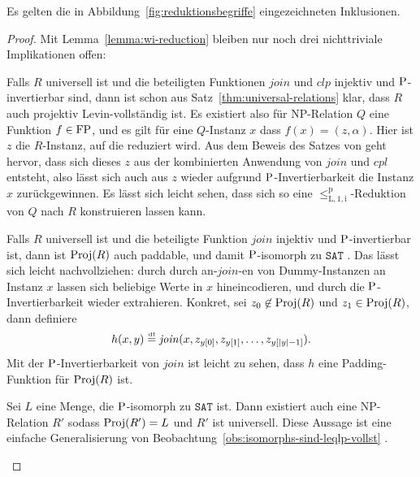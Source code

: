 \begin{lemma}
    Es gelten die in Abbildung~\ref{fig:reduktionsbegriffe} eingezeichneten Inklusionen.
\end{lemma}
\begin{proof}
    Mit Lemma~\ref{lemma:wi-reduction} bleiben nur noch drei nichttriviale Implikationen offen:
    \begin{prooflist}[label={\arabic*.},labelsep=3pt]
        \item Falls $R$ universell ist und die beteiligten Funktionen $\mathit{join}$ und $\mathit{clp}$ injektiv und $\P$-invertierbar sind, dann ist schon aus Satz~\ref{thm:universal-relations} klar, dass $R$ auch projektiv Levin-vollständig ist.
            Es existiert also für NP-Relation $Q$ eine Funktion $f\in\FP$, und es gilt für eine $Q$-Instanz $x$ dass $f(x)=(z,\alpha)$. Hier ist $z$ die $R$-Instanz, auf die reduziert wird.
            Aus dem Beweis des Satzes von \textcite{agrawal_universal_1992} geht hervor, dass sich dieses $z$ aus der kombinierten Anwendung von $\mathit{join}$ und $\mathit{cpl}$ entsteht, also lässt sich auch aus $z$ wieder aufgrund $\P$-Invertierbarkeit die Instanz $x$ zurückgewinnen.
            Es lässt sich leicht sehen, dass sich so eine $\leq_\mathrm{L,1,i}^\mathrm p$-Reduktion von $Q$ nach $R$ konstruieren lassen kann.
        \item  Falls $R$ universell ist und die beteiligte Funktion $\mathit{join}$ injektiv und $\P$-invertierbar ist, dann ist $\Proj(R)$ auch paddable, und damit $\P$-isomorph zu $\mathtt{SAT}$ \parencite[Thm.~8.2]{agrawal_universal_1992}. Das lässt sich leicht nachvollziehen: durch  durch an-$\mathit{join}$-en von Dummy-Instanzen an Instanz $x$ lassen sich beliebige Werte in $x$ hineincodieren, und durch die $\P$-Invertierbarkeit wieder extrahieren.
            Konkret, sei $z_0\not\in\Proj(R)$ und $z_1\in\Proj(R)$, dann definiere
            \[ h(x,y)\defeq \mathit{join}(x, z_{y[0]}, z_{y[1]}, \ldots, z_{y[|y|-1]}). \]
            Mit der $\P$-Invertierbarkeit von $\mathit{join}$ ist leicht zu sehen, dass $h$ eine Padding-Funktion für $\Proj(R)$ ist.
    \item Sei $L$ eine Menge, die $\P$-isomorph zu $\mathtt{SAT}$ ist. Dann existiert auch eine NP-Relation $R'$ sodass $\Proj(R')=L$ und $R'$ ist universell. Diese Aussage ist eine einfache Generalisierung von Beobachtung~\ref{obs:isomorphs-sind-leqlp-vollst} \parencite[vgl.][Prop.~8.5]{agrawal_universal_1992}.
    \end{prooflist}
\end{proof}

